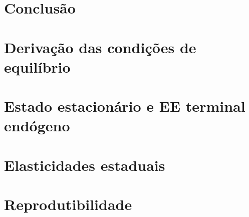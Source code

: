 \documentclass[12pt,a4paper]{article}
\newcommand{\fonte}[1]{\vspace{0.05cm}\captionsetup{font=scriptsize}\caption*{\footnotesize Fonte: #1}}
\begin{document}
\section{Conclus\~ao}


\appendix
\section{Deriva\c{c}\~ao das condi\c{c}\~oes de equil\'ibrio}\label{ap:deriv}

\section{Estado estacion\'ario e EE terminal end\'ogeno}\label{ap:ss}

\section{Elasticidades estaduais}\label{ap:elast}
\begin{table}[H]
\centering
\caption{Elasticidade sal\'ario-educa\c{c}\~ao por UF: bruta (\emph{bootstrap}) e encolhida (EB)}
\label{tab:elastuf}
\scriptsize

\fonte{Elabora\c{c}\~ao pr\'opria a partir de 2.000 reamostragens.}
\end{table}

\section{Reprodutibilidade}\label{ap:repro}
\end{document}
